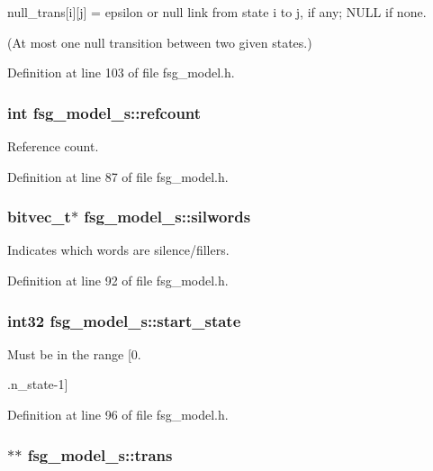 null\_\-trans[i][j] = epsilon or null link from state i to j, if any; NULL if none. 

(At most one null transition between two given states.) 

Definition at line 103 of file fsg\_\-model.h.
\subsubsection[{refcount}]{\setlength{\rightskip}{0pt plus 5cm}int {\bf fsg\_\-model\_\-s::refcount}}\label{structfsg__model__s_f329127556a42f6ea3b27f41a99a0b17}


Reference count. 



Definition at line 87 of file fsg\_\-model.h.
\subsubsection[{silwords}]{\setlength{\rightskip}{0pt plus 5cm}bitvec\_\-t$\ast$ {\bf fsg\_\-model\_\-s::silwords}}\label{structfsg__model__s_b5709e67c1b7506ab024f2060d50331c}


Indicates which words are silence/fillers. 



Definition at line 92 of file fsg\_\-model.h.
\subsubsection[{start\_\-state}]{\setlength{\rightskip}{0pt plus 5cm}int32 {\bf fsg\_\-model\_\-s::start\_\-state}}\label{structfsg__model__s_4ff49da3938ecc236d45a68d009f97b9}


Must be in the range [0. 

.n\_\-state-1] 

Definition at line 96 of file fsg\_\-model.h.
\subsubsection[{trans}]{$\ast$$\ast$ {\bf fsg\_\-model\_\-s::trans}}\label{structfsg__model__s_c6ce03fadfbd11166a0eb9d9cb79b854}


